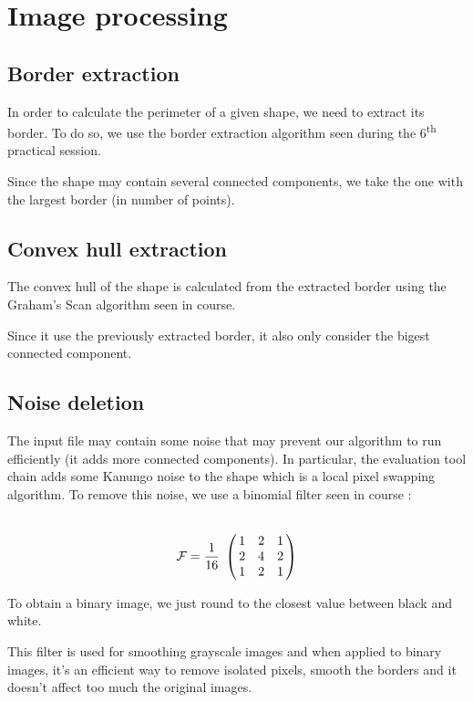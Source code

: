 \documentclass[a4paper,12pt]{article}
\theoremstyle{example}
\theoremstyle{remark}
\theoremstyle{definition}
\begin{document}
\section{Image processing}

\subsection{Border extraction}

In order to calculate the perimeter of a given shape, we need to extract its border. To do so, we use the border extraction algorithm seen during the 6\textsuperscript{th} practical session.


Since the shape may contain several connected components, we take the one with the largest border (in number of points).

\subsection{Convex hull extraction}

The convex hull of the shape is calculated from the extracted border using the Graham’s Scan algorithm seen in course.


Since it use the previously extracted border, it also only consider the bigest connected component.


\subsection{Noise deletion}

The input file may contain some noise that may prevent our algorithm to run efficiently (it adds more connected components). In particular, the evaluation tool chain adds some Kanungo noise to the shape which is a local pixel swapping algorithm. To remove this noise, we use a binomial filter seen in course :

\[ \mathcal{F} = \frac{1}{16}\bordermatrix{ &&& \cr
& 1 & 2 & 1 \cr
& 2 & 4 & 2 \cr
& 1 & 2 & 1}\]

To obtain a binary image, we just round to the closest value between black and white.

This filter is used for smoothing grayscale images and when applied to binary images, it's an efficient way to remove isolated pixels, smooth the borders and it doesn't affect too much the original images.
\end{document}
